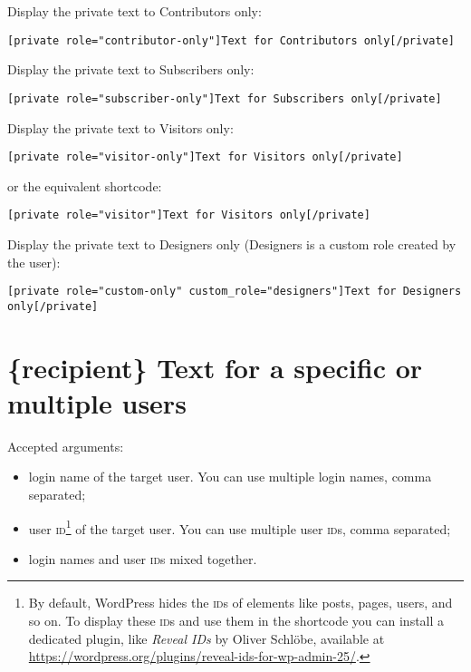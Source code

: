 Display the private text to Contributors only:

\begin{lstlisting}
[private role="contributor-only"]Text for Contributors only[/private]
\end{lstlisting}

Display the private text to Subscribers only:

\begin{lstlisting}
[private role="subscriber-only"]Text for Subscribers only[/private]
\end{lstlisting}

Display the private text to Visitors only:

\begin{lstlisting}
[private role="visitor-only"]Text for Visitors only[/private]
\end{lstlisting}

or the equivalent shortcode:

\begin{lstlisting}
[private role="visitor"]Text for Visitors only[/private]
\end{lstlisting}

Display the private text to Designers only (Designers is a custom role created
by the user):

\begin{lstlisting}
[private role="custom-only" custom_role="designers"]Text for Designers only[/private]
\end{lstlisting}

\section{\{recipient\} Text for a specific or multiple users}

Accepted arguments:

\begin{itemize}
  \item login name of the target user. You can use multiple login names, comma
  separated;
  \item user \textsc{id}\footnote{By default, WordPress hides the \textsc{id}s
  of elements like posts, pages, users, and so on. To display these \textsc{id}s
  and use them in the shortcode you can install a dedicated plugin, like
  \textit{Reveal IDs} by Oliver Schlöbe, available at
  \url{https://wordpress.org/plugins/reveal-ids-for-wp-admin-25/}.} of the
  target user. You can use multiple user \textsc{id}s, comma separated;
  \item login names and user \textsc{id}s mixed together.
\end{itemize}

